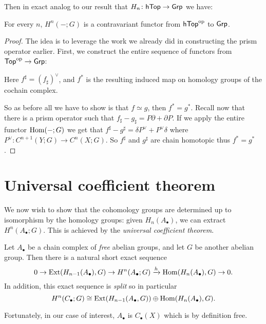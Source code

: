 Then in exact analog to our result that $H_n \colon \mathsf{hTop} \to \mathsf{Grp}$ we have:
\begin{theorem}
	For every $n$, $H^n(-;G)$ is a contravariant functor
	from $\mathsf{hTop}^{\mathrm{op}}$ to $\mathsf{Grp}$.
\end{theorem}
\begin{proof}
	The idea is to leverage the work we already did in constructing
	the prism operator earlier.
	First, we construct the entire sequence of functors
	from $\mathsf{Top}^{\mathrm{op}} \to \mathsf{Grp}$:
	\begin{center}
	\end{center}
	Here $f^\sharp = (f_\sharp)^\vee$, and $f^\ast$
	is the resulting induced map on homology groups of the cochain complex.

	So as before all we have to show is that $f \simeq g$,
	then $f^\ast = g^\ast$.
	Recall now that there is a prism operator such that
	$f_\sharp - g_\sharp = P \partial + \partial P$.
	If we apply the entire functor $\operatorname{Hom}(-;G)$ we get that
	$f^\sharp - g^\sharp = \delta P^\vee + P^\vee \delta$
	where $P^\vee \colon C^{n+1}(Y;G) \to C^n(X;G)$.
	So $f^\sharp$ and $g^\sharp$ are chain homotopic thus $f^\ast = g^\ast$.
\end{proof}


\section{Universal coefficient theorem}
We now wish to show that the cohomology groups are determined up to isomorphism
by the homology groups: given $H_n(A_\bullet)$, we can extract $H^n(A_\bullet; G)$.
This is achieved by the \emph{universal coefficient theorem}.
\begin{theorem}
	Let $A_\bullet$ be a chain complex of \emph{free} abelian groups,
	and let $G$ be another abelian group.
	Then there is a natural short exact sequence
	\[
		0 \to \operatorname{Ext}(H_{n-1}(A_\bullet), G) \to H^n(A_\bullet; G)
		\xrightarrow{h} \operatorname{Hom}(H_n(A_\bullet), G) \to 0. \]
	In addition, this exact sequence is \emph{split}
	so in particular
	\[ H^n(C_\bullet; G) \cong \operatorname{Ext}(H_{n-1}(A_\bullet, G))
		\oplus \operatorname{Hom}(H_n(A_\bullet), G). \]
\end{theorem}
Fortunately, in our case of interest, $A_\bullet$ is $C_\bullet(X)$
which is by definition free.

